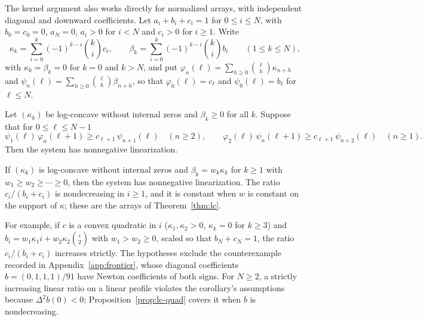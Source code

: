 The kernel argument also works directly for normalized arrays, with independent diagonal and downward coefficients. Let $a_i+b_i+c_i=1$ for $0\leq i\leq N$, with $b_0=c_0=0$, $a_N=0$, $a_i>0$ for $i<N$ and $c_i>0$ for $i\geq1$. Write
\[
\kappa_k=\sum_{i=0}^k(-1)^{k-i}\binom kic_i,\qquad\beta_k=\sum_{i=0}^k(-1)^{k-i}\binom kib_i\qquad(1\leq k\leq N),
\]
with $\kappa_k=\beta_k=0$ for $k=0$ and $k>N$, and put $\varphi_n(\ell)=\sum_{h\geq0}\binom\ell h\kappa_{n+h}$ and $\psi_n(\ell)=\sum_{h\geq0}\binom\ell h\beta_{n+h}$, so that $\varphi_0(\ell)=c_\ell$ and $\psi_0(\ell)=b_\ell$ for $\ell\leq N$.

\begin{theorem}\label{thm:lc-vary}
Let $(\kappa_k)$ be log-concave without internal zeros and $\beta_k\geq0$ for all $k$. Suppose that for $0\leq\ell\leq N-1$
\[
\psi_1(\ell)\,\varphi_n(\ell+1)\geq c_{\ell+1}\,\psi_{n+1}(\ell)\quad(n\geq2),\qquad\varphi_2(\ell)\,\psi_n(\ell+1)\geq c_{\ell+1}\,\psi_{n+2}(\ell)\quad(n\geq1).
\]
Then the system has nonnegative linearization.
\end{theorem}

\begin{corollary}\label{cor:lc-vary}
If $(\kappa_k)$ is log-concave without internal zeros and $\beta_k=w_k\kappa_k$ for $k\geq1$ with $w_1\geq w_2\geq\cdots\geq0$, then the system has nonnegative linearization. The ratio $c_i/(b_i+c_i)$ is nondecreasing in $i\geq1$, and it is constant when $w$ is constant on the support of $\kappa$; these are the arrays of Theorem~\ref{thm:lc}.
\end{corollary}

For example, if $c$ is a convex quadratic in $i$ ($\kappa_1,\kappa_2>0$, $\kappa_k=0$ for $k\geq3$) and $b_i=w_1\kappa_1i+w_2\kappa_2\binom i2$ with $w_1>w_2\geq0$, scaled so that $b_N+c_N=1$, the ratio $c_i/(b_i+c_i)$ increases strictly. The hypotheses exclude the counterexample recorded in Appendix~\ref{app:frontier}, whose diagonal coefficients $b=(0,1,1,1)/91$ have Newton coefficients of both signs. For $N\geq2$, a strictly increasing linear ratio on a linear profile violates the corollary's assumptions because $\Delta^2b(0)<0$; Proposition~\ref{prop:lc-quad} covers it when $b$ is nondecreasing.

